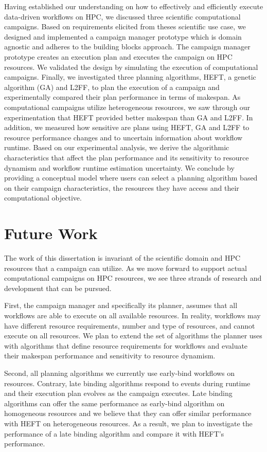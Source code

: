 Having established our understanding on how to effectively and efficiently 
execute data-driven workflows on HPC, we discussed three scientific 
computational campaigns. Based on requirements elicited from theses scientific 
use case, we designed and implemented a campaign manager prototype which is 
domain agnostic and adheres to the building blocks approach. The campaign 
manager prototype creates an execution plan and executes the campaign on HPC 
resources. We validated the design by simulating the execution of 
computational campaigns. Finally, we investigated three planning algorithms, 
HEFT, a genetic algorithm (GA) and L2FF, to plan the execution of a campaign 
and experimentally compared their plan performance in terms of makespan. As 
computational campaigns utilize heterogeneous resources, we saw through our 
experimentation that HEFT provided better makespan than GA and L2FF. In 
addition, we measured how sensitive are plans using HEFT, GA and L2FF to 
resource performance changes and to uncertain information about workflow 
runtime. Based on our experimental analysis, we derive the algorithmic 
characteristics that affect the plan performance and its sensitivity to 
resource dynamism and workflow runtime estimation uncertainty. We conclude by 
providing a conceptual model where users can select a planning algorithm based 
on their campaign characteristics, the resources they have access and their 
computational objective.


\section{Future Work}
The work of this dissertation is invariant of the scientific domain and HPC 
resources that a campaign can utilize. As we move forward to support actual 
computational campaigns on HPC resources, we see three strands of research and 
development that can be pursued.

First, the campaign manager and specifically its planner, assumes that all 
workflows are able to execute on all available resources. In reality, 
workflows may have different resource requirements, number and type of 
resources, and cannot execute on all resources. We plan to extend the set of 
algorithms the planner uses with algorithms that define resource requirements 
for workflows and evaluate their makespan performance and sensitivity to 
resource dynamism.

Second, all planning algorithms we currently use early-bind workflows on 
resources. Contrary, late binding algorithms respond to events during runtime 
and their execution plan evolves as the campaign executes. Late binding 
algorithms can offer the same performance as early-bind algorithm on 
homogeneous resources and we believe that they can offer similar performance 
with HEFT on heterogeneous resources. As a result, we plan to investigate the 
performance of a late binding algorithm and compare it with HEFT's performance.

